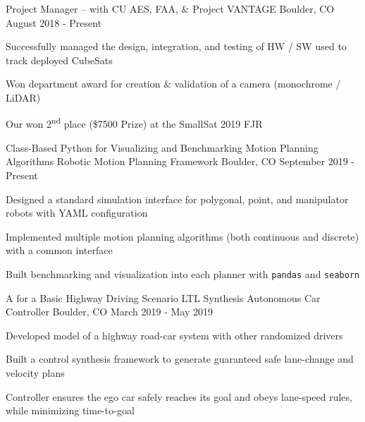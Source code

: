 \begin{cventries}
\cventry
    {Project Manager --  with CU AES, FAA, \& }
    {Project VANTAGE}
    {Boulder, CO}
    {August 2018 - Present}
    {
     \begin{cvitems}
      \item{Successfully managed the design, integration, and testing of HW / SW used to track deployed CubeSats}
      \item{Won department award for creation \& validation of a camera (monochrome / LiDAR) }
      \item{Our
       won 2\textsuperscript{nd} place (\$7500 Prize) at the SmallSat 2019 FJR }
     \end{cvitems}
    }
    
  \cventry
  	{Class-Based Python   for Visualizing and Benchmarking Motion Planning Algorithms }
    {Robotic Motion Planning Framework}
    {Boulder, CO}
    {September 2019 - Present}
    {
      \begin{cvitems}
        \item{Designed a standard simulation interface for polygonal, point, and manipulator robots with YAML configuration}
        \item{Implemented multiple motion planning algorithms (both continuous and discrete) with a common interface}
        \item {Built benchmarking and visualization into each planner with \texttt{pandas} and \texttt{seaborn}}
      \end{cvitems}
    }

  \cventry
  	{A  for a Basic Highway Driving Scenario}
    {LTL Synthesis Autonomous Car Controller}
    {Boulder, CO}
    {March 2019 - May 2019}
    {
      \begin{cvitems}
        \item{Developed model of a highway road-car system with other randomized drivers}
        \item{Built a control synthesis framework to generate guaranteed safe lane-change and velocity plans}
        \item {Controller ensures the ego car safely reaches its goal and obeys lane-speed rules, while minimizing time-to-goal}
      \end{cvitems}
    }
\end{cventries}
